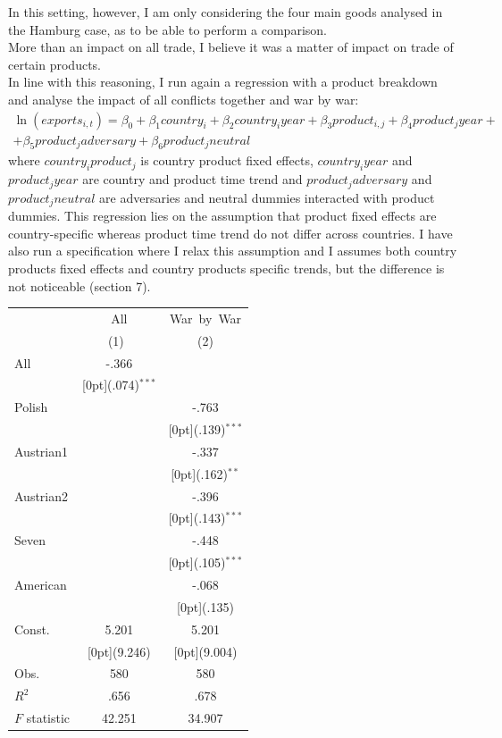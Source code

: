 \documentclass[12pt,a4paper,titlepage]{article}
\begin{document}
In this setting, however, I am only considering the four main goods analysed in the Hamburg case, as to be able to perform a comparison.\\
More than an impact on all trade, I believe it was a matter of impact on trade of certain products. \\
In line with this reasoning, I run again a regression with a product breakdown and analyse the impact of all conflicts together and war by war:
\begin{multline}
\ln(exports_{i,t})=\beta_0+\beta_1country_i+\beta_2country_iyear+\beta_3product_{i,j}+\beta_4product_jyear+\\+\beta_5product_jadversary + \beta_6product_jneutral
\end{multline}
where $country_iproduct_j$ is country product fixed effects, $country_iyear$ and $product_jyear$ are country and product time trend and $product_jadversary$ and $product_jneutral$ are adversaries and neutral dummies interacted with product dummies. This regression lies on the assumption that product fixed effects are country-specific whereas product time trend do not differ across countries. I have also run a specification where I relax this assumption and I assumes both country products fixed effects and country products specific trends, but the difference is not noticeable (section 7). 
 \label{tab:title} 
\begin{tabular*}{\textwidth}{@{\extracolsep{\fill}}lcc}		
	& \multicolumn{1}{c}{All} &	\multicolumn{1}{c}{War~by~War} \\
\cline{2-3}		
	& \multicolumn{1}{c}{(1)\mbox{\ }} &	\multicolumn{1}{c}{(2)} \\
\hline		
All &	-.366 &	\\
&	\raisebox{.7ex}[0pt]{\scriptsize (.074)$^{***}$} &	\\
Polish &	&	-.763 \\
&	&	\raisebox{.7ex}[0pt]{\scriptsize (.139)$^{***}$} \\
Austrian1 &	&	-.337 \\
&	&	\raisebox{.7ex}[0pt]{\scriptsize (.162)$^{**}$} \\
Austrian2 &	&	-.396 \\
&	&	\raisebox{.7ex}[0pt]{\scriptsize (.143)$^{***}$} \\
Seven &	&	-.448 \\
&	&	\raisebox{.7ex}[0pt]{\scriptsize (.105)$^{***}$} \\
American &	&	-.068 \\
&	&	\raisebox{.7ex}[0pt]{\scriptsize (.135)} \\
Const. &	5.201 &	5.201 \\
&	\raisebox{.7ex}[0pt]{\scriptsize (9.246)} &	\raisebox{.7ex}[0pt]{\scriptsize (9.004)} \\
Obs. &	580 &	580 \\
$ R^2$ &	.656 &	.678 \\
$ F$ statistic &	42.251 &	34.907 \\
\hline\hline		
\end{tabular*}%
\newpage
\end{document}
